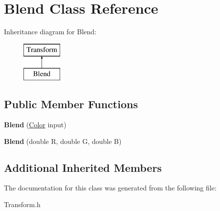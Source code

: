 \hypertarget{class_blend}{}\section{Blend Class Reference}
\label{class_blend}
Inheritance diagram for Blend\+:\begin{figure}[H]
\begin{center}
\leavevmode
\includegraphics[height=2.000000cm]{class_blend}
\end{center}
\end{figure}
\subsection*{Public Member Functions}
\begin{DoxyCompactItemize}
\item 
\hypertarget{class_blend_a261679845165eb662efef8ce50cc0769}{}\label{class_blend_a261679845165eb662efef8ce50cc0769} 
{\bfseries Blend} (\hyperlink{class_color}{Color} input)
\item 
\hypertarget{class_blend_aea029e18e6b6daba142f0c785461e1ae}{}\label{class_blend_aea029e18e6b6daba142f0c785461e1ae} 
{\bfseries Blend} (double R, double G, double B)
\end{DoxyCompactItemize}
\subsection*{Additional Inherited Members}


The documentation for this class was generated from the following file\+:\begin{DoxyCompactItemize}
\item 
Transform.\+h\end{DoxyCompactItemize}
